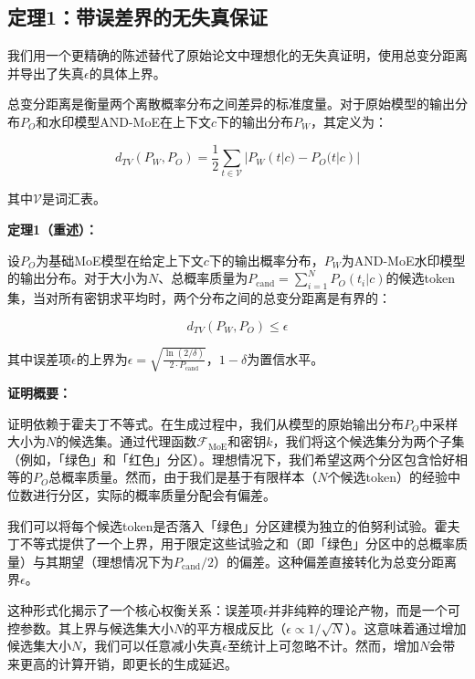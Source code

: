 \documentclass[letterpaper,twocolumn,10pt]{article}
\begin{document}
\subsection{定理1：带误差界的无失真保证}

我们用一个更精确的陈述替代了原始论文中理想化的无失真证明，使用总变分距离并导出了失真$\epsilon$的具体上界。

总变分距离是衡量两个离散概率分布之间差异的标准度量。对于原始模型的输出分布$P_O$和水印模型AND-MoE在上下文$c$下的输出分布$P_W$，其定义为：

\begin{equation}
d_{TV}(P_W, P_O) = \frac{1}{2} \sum_{t \in \mathcal{V}} |P_W(t|c) - P_O(t|c)|
\end{equation}

其中$\mathcal{V}$是词汇表。

\textbf{定理1（重述）：}

设$P_O$为基础MoE模型在给定上下文$c$下的输出概率分布，$P_W$为AND-MoE水印模型的输出分布。对于大小为$N$、总概率质量为$P_{\text{cand}} = \sum_{i=1}^N P_O(t_i|c)$的候选token集，当对所有密钥求平均时，两个分布之间的总变分距离是有界的：

\begin{equation}
d_{TV}(P_W, P_O) \le \epsilon
\end{equation}

其中误差项$\epsilon$的上界为$\epsilon = \sqrt{\frac{\ln(2/\delta)}{2 \cdot P_{\text{cand}}}}$，$1-\delta$为置信水平。

\textbf{证明概要：}

证明依赖于霍夫丁不等式\cite{hoeffding1963probability}。在生成过程中，我们从模型的原始输出分布$P_O$中采样大小为$N$的候选集。通过代理函数$\mathcal{F}_{\text{MoE}}$和密钥$k$，我们将这个候选集分为两个子集（例如，「绿色」和「红色」分区）。理想情况下，我们希望这两个分区包含恰好相等的$P_O$总概率质量。然而，由于我们是基于有限样本（$N$个候选token）的经验中位数进行分区，实际的概率质量分配会有偏差。

我们可以将每个候选token是否落入「绿色」分区建模为独立的伯努利试验。霍夫丁不等式提供了一个上界，用于限定这些试验之和（即「绿色」分区中的总概率质量）与其期望（理想情况下为$P_{\text{cand}}/2$）的偏差。这种偏差直接转化为总变分距离界$\epsilon$。

这种形式化揭示了一个核心权衡关系：误差项$\epsilon$并非纯粹的理论产物，而是一个可控参数。其上界与候选集大小$N$的平方根成反比（$\epsilon \propto 1/\sqrt{N}$）。这意味着通过增加候选集大小$N$，我们可以任意减小失真$\epsilon$至统计上可忽略不计。然而，增加$N$会带来更高的计算开销，即更长的生成延迟。
\end{document}
